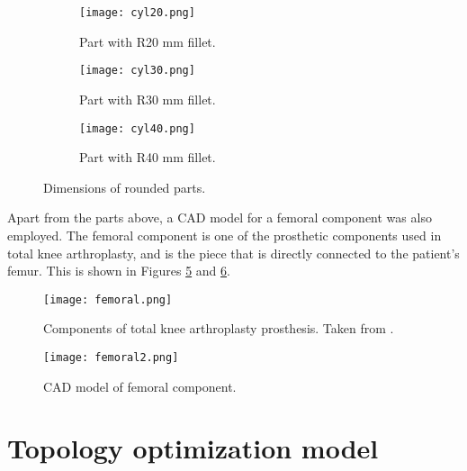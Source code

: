 \documentclass[../main.tex]{subfiles}
\begin{document}
\begin{figure}
  \begin{subfigure}{0.3\textwidth}
	\begin{center}
		\texttt{[image: cyl20.png]}
	\end{center}
	\caption{Part with R20 mm fillet.}\label{fig:cyl20}
  \end{subfigure}
\begin{subfigure}{0.3\textwidth}
	\begin{center}
		\texttt{[image: cyl30.png]}
	\end{center}
	\caption{Part with R30 mm fillet.}\label{fig:cyl30}
\end{subfigure}
\begin{subfigure}{0.3\textwidth}
	\begin{center}
		\texttt{[image: cyl40.png]}
	\end{center}
	\caption{Part with R40 mm fillet.}\label{fig:cyl40}
\end{subfigure}
\caption{Dimensions of rounded parts.}
\end{figure}

Apart from the parts above, a CAD model for a femoral component was also employed. The femoral component is one of the prosthetic components used in total knee arthroplasty, and is the piece that is directly connected to the patient's femur. This is shown in Figures \ref{fig:fem1} and \ref{fig:fem2}.

\begin{figure}
  \begin{center}
  \texttt{[image: femoral.png]}
\end{center}
  \caption{Components of total knee arthroplasty prosthesis. Taken from \cite{leopoldMinimallyInvasiveTotal2009}.}
  \label{fig:fem1}
\end{figure}

\begin{figure}
  \begin{center}
  \texttt{[image: femoral2.png]}
\end{center}
  \caption{CAD model of femoral component.}
  \label{fig:fem2}
\end{figure}

\section{Topology optimization model}
\end{document}
